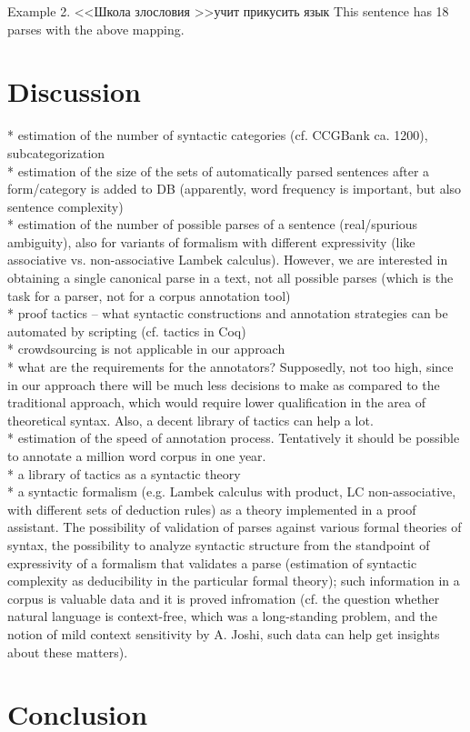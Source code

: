 \documentclass[a4paper]{article}
\theoremstyle{example-style}
\begin{document}
Example 2. \textless\textless Школа злословия \textgreater\textgreater учит прикусить язык
This sentence has 18 parses with the above mapping.


\section{Discussion}

  * estimation of the number of syntactic categories (cf. CCGBank ca. 1200), subcategorization \\
  
  * estimation of the size of the sets of automatically parsed sentences after a form/category is added to DB (apparently, word frequency is important, but also sentence complexity) \\
  
  * estimation of the number of possible parses of a sentence (real/spurious ambiguity), also for variants of formalism with different expressivity (like associative vs. non-associative Lambek calculus). However, we are interested in obtaining a single canonical parse in a text, not all possible parses (which is the task for a parser, not for a corpus annotation tool) \\
  
  * proof tactics -- what syntactic constructions and annotation strategies can be automated by scripting (cf. tactics in Coq) \\
  
  * crowdsourcing is not applicable in our approach \\
  
  * what are the requirements for the annotators? Supposedly, not too high, since in our approach there will be much less decisions  to make as compared to the traditional approach, which would require lower qualification in the area of theoretical syntax. Also, a decent library of tactics can help a lot. \\
  
  * estimation of the speed of annotation process. Tentatively it should be possible to annotate a million word corpus in one year.\\
  
  * a library of tactics as a syntactic theory \\
  
  * a syntactic formalism (e.g. Lambek calculus with product, LC non-associative, with different sets of deduction rules) as a theory implemented in a proof assistant. The possibility of validation of parses against various formal theories of syntax, the possibility to analyze syntactic structure from the standpoint of expressivity of a formalism that validates a parse (estimation of syntactic complexity as deducibility in the particular formal theory); such information in a corpus is valuable data and it is proved infromation (cf. the question whether natural language is context-free, which was a long-standing problem, and the notion of mild context sensitivity by A. Joshi, such data can help get insights about these matters).

\section{Conclusion}

\printbibliography[resetnumbers=true]
\end{document}

